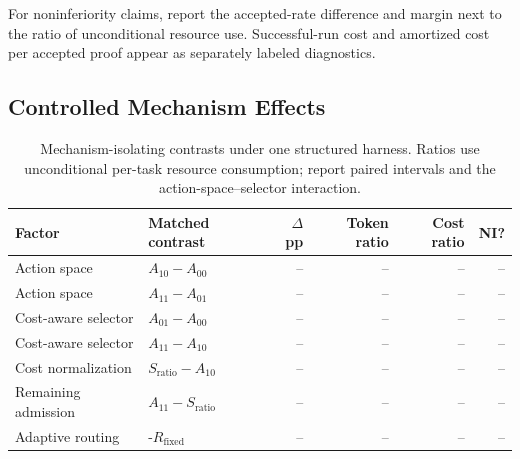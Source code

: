 
For noninferiority claims, report the accepted-rate difference and margin next
to the ratio of unconditional resource use. Successful-run cost and amortized
cost per accepted proof appear as separately labeled diagnostics.

\subsection{Controlled Mechanism Effects}

\begin{table}[ht]
\centering
\small
\begin{tabular}{llrrrr}
\toprule
Factor & Matched contrast & \(\Delta\) pp & Token ratio & Cost ratio & NI? \\
\midrule
Action space & \(A_{10}-A_{00}\) & -- & -- & -- & -- \\
Action space & \(A_{11}-A_{01}\) & -- & -- & -- & -- \\
Cost-aware selector & \(A_{01}-A_{00}\) & -- & -- & -- & -- \\
Cost-aware selector & \(A_{11}-A_{10}\) & -- & -- & -- & -- \\
Cost normalization & \(S_{\mathrm{ratio}}-A_{10}\) & -- & -- & -- & -- \\
Remaining admission & \(A_{11}-S_{\mathrm{ratio}}\) & -- & -- & -- & -- \\
Adaptive routing & \system{}-\(R_{\mathrm{fixed}}\) & -- & -- & -- & -- \\
\bottomrule
\end{tabular}
\caption{Mechanism-isolating contrasts under one structured harness. Ratios
use unconditional per-task resource consumption; report paired intervals and
the action-space--selector interaction.}
\label{tab:mechanisms}
\end{table}


